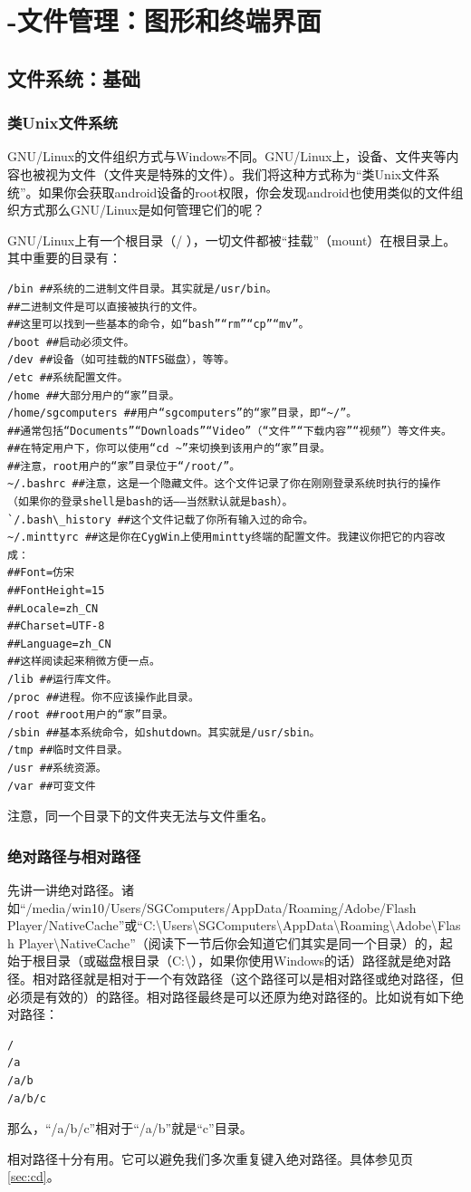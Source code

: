 \chapter{-文件管理：图形和终端界面}
\section{文件系统：基础}
\subsection{类Unix文件系统}
GNU/Linux的文件组织方式与Windows不同。GNU/Linux上，设备、文件夹等内容也被视为文件（文件夹是特殊的文件）。我们将这种方式称为“类Unix文件系统”。如果你会获取android设备的root权限，你会发现android也使用类似的文件组织方式那么GNU/Linux是如何管理它们的呢？\par
GNU/Linux上有一个根目录（/ ），一切文件都被“挂载”（mount）在根目录上。其中重要的目录有：
\begin{verbatim}
/bin ##系统的二进制文件目录。其实就是/usr/bin。
##二进制文件是可以直接被执行的文件。
##这里可以找到一些基本的命令，如“bash”“rm”“cp”“mv”。
/boot ##启动必须文件。
/dev ##设备（如可挂载的NTFS磁盘），等等。
/etc ##系统配置文件。
/home ##大部分用户的“家”目录。
/home/sgcomputers ##用户“sgcomputers”的“家”目录，即“~/”。
##通常包括“Documents”“Downloads”“Video”（“文件”“下载内容”“视频”）等文件夹。
##在特定用户下，你可以使用“cd ~”来切换到该用户的“家”目录。
##注意，root用户的“家”目录位于“/root/”。
~/.bashrc ##注意，这是一个隐藏文件。这个文件记录了你在刚刚登录系统时执行的操作
（如果你的登录shell是bash的话——当然默认就是bash）。
`/.bash\_history ##这个文件记载了你所有输入过的命令。
~/.minttyrc ##这是你在CygWin上使用mintty终端的配置文件。我建议你把它的内容改成：
##Font=仿宋
##FontHeight=15
##Locale=zh_CN
##Charset=UTF-8
##Language=zh_CN
##这样阅读起来稍微方便一点。
/lib ##运行库文件。
/proc ##进程。你不应该操作此目录。
/root ##root用户的“家”目录。
/sbin ##基本系统命令，如shutdown。其实就是/usr/sbin。
/tmp ##临时文件目录。
/usr ##系统资源。
/var ##可变文件
\end{verbatim} \par
注意，同一个目录下的文件夹无法与文件重名。
\subsection{绝对路径与相对路径}
\label{sec:path}先讲一讲绝对路径。诸如“/media/win10/Users/SGComputers/AppData/Roaming/Adobe/Flash Player/NativeCache”或“C:\textbackslash Users\textbackslash SGComputers\textbackslash AppData\textbackslash Roaming\textbackslash Adobe\textbackslash Flash Player\textbackslash NativeCache”（阅读下一节后你会知道它们其实是同一个目录）的，起始于根目录（或磁盘根目录（C:\textbackslash），如果你使用Windows的话）路径就是绝对路径。相对路径就是相对于一个有效路径（这个路径可以是相对路径或绝对路径，但必须是有效的）的路径。相对路径最终是可以还原为绝对路径的。比如说有如下绝对路径：
\begin{verbatim}
/
/a
/a/b
/a/b/c
\end{verbatim} \par
那么，“/a/b/c”相对于“/a/b”就是“c”目录。\par
相对路径十分有用。它可以避免我们多次重复键入绝对路径。具体参见\pageref{sec:cd}页\ref{sec:cd}。

